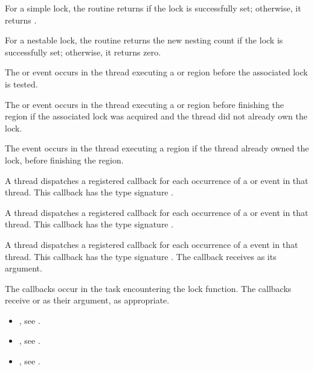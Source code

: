 For a simple lock, the  routine returns  if the lock is successfully
set; otherwise, it returns .

For a nestable lock, the  routine returns the new nesting count
if the lock is successfully set; otherwise, it returns zero.

\events

The  or  event occurs in the thread
executing a  or  region
before the associated lock is tested.

The  or  event occurs in the thread
executing a  or  region
before finishing the region if the associated lock was acquired and the thread did not already own the lock.

The  event occurs in the thread
executing a  region
if the thread already owned the lock,
before finishing the region.


\tools

A thread dispatches a registered 
callback for each occurrence of a  or  event
in that thread.  This callback has the type signature .

A thread dispatches a registered 
callback for each occurrence of a  or  event
in that thread.  This callback has the type signature .

A thread dispatches a registered 
callback for each occurrence of a  event
in that thread. This callback has the type signature .
The callback receives  as its  argument.

The callbacks occur in the task encountering
the lock function.  The callbacks receive  or
  as their  argument, as appropriate.


\crossreferences
\begin{itemize}
\item {}, see
.
\item {}, see
.
\item {}, see
.
\end{itemize}

